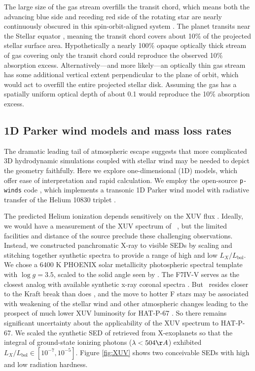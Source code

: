 \documentclass[twocolumn]{aastex631}
\newcommand{\hatp}{\object{HAT-P-67}~}
\newcommand{\hatpb}{\object{HAT-P-67 b}}
\begin{document}
The large size of the gas stream overfills the transit chord, which means both the advancing blue side and receding red side of the rotating star are nearly continuously obscured in this spin-orbit-aligned system \citep{2017AJ....153..211Z}. The planet transits near the Stellar equator \citep{2017AJ....153..211Z}, meaning the transit chord covers about 10$\%$ of the projected stellar surface area.  Hypothetically a nearly 100$\%$ opaque optically thick stream of gas covering only the transit chord could reproduce the observed 10$\%$ absorption excess.  Alternatively---and more likely---an optically thin gas stream has some additional vertical extent perpendicular to the plane of orbit, which would act to overfill the entire projected stellar disk.  Assuming the gas has a spatially uniform optical depth of about 0.1 would reproduce the 10\% absorption excess.


\subsection{1D Parker wind models and mass loss rates}\label{pwinds}
The dramatic leading tail of atmospheric escape suggests that more complicated 3D hydrodynamic simulations coupled with stellar wind \citep{2022ApJ...926..226M} may be needed to depict the geometry faithfully.  Here we explore one-dimensional (1D) models, which offer ease of interpretation and rapid calculation.  We employ the open-source \texttt{p-winds} code \citep{2022A&A...659A..62D}, which implements a transonic 1D Parker wind model with radiative transfer of the Helium 10830 triplet \citep{2018ApJ...855L..11O,2020A&A...636A..13L}.

The predicted Helium ionization depends sensitively on the XUV flux \citep{2019ApJ...881..133O}.  Ideally, we would have a measurement of the XUV spectrum of \hatp, but the limited facilities and distance of the source preclude these challenging observations.  Instead, we constructed panchromatic X-ray to visible SEDs by scaling and stitching together synthetic spectra to provide a range of high and low $L_X/L_\mathrm{bol}$.  We chose a 6400 K PHOENIX \citep{husser13} solar metallicity photospheric spectral template with $\log{g}=3.5$, scaled to the solid angle seen by \hatpb.  The F7IV-V  serves as the closest analog with available synthetic x-ray coronal spectra \citep{2011A&A...532A...6S}.  But \hatp resides closer to the Kraft break than does , and the move to hotter F stars may be associated with weakening of the stellar wind and other atmospheric changes leading to the prospect of much lower XUV luminosity for HAT-P-67 \citep{2022ApJ...930....7A}.  So there remains significant uncertainty about the applicability of the  XUV spectrum to HAT-P-67.  We scaled the synthetic SED of  retrieved from X-exoplanets \citep{2011A&A...532A...6S} so that the integral of ground-state ionizing photons ($\lambda<504\AA$) exhibited $L_X/L_\mathrm{bol} \in [10^{-7}, 10^{-5}]$.  Figure \ref{fig:XUV} shows two conceivable SEDs with high and low radiation hardness.
\end{document}
